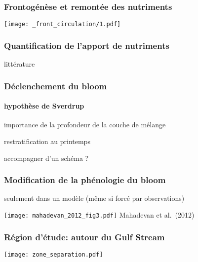 
\begin{frame}
  \frametitle{Frontogénèse et remontée des nutriments}
  \centering
  \texttt{[image: \_front\_circulation/1.pdf]}%
\end{frame}


\begin{frame}
  \frametitle{Quantification de l'apport de nutriments}

  littérature

\end{frame}


\begin{frame}
  \frametitle{Déclenchement du bloom}
  \framesubtitle{hypothèse de Sverdrup}
  importance de la profondeur de la couche de mélange

  restratification au printemps

  accompagner d'un schéma ?
\end{frame}


\begin{frame}
  \frametitle{Modification de la phénologie du bloom}
  seulement dans un modèle (même si forcé par observations)

  \texttt{[image: mahadevan\_2012\_fig3.pdf]}
  Mahadevan et al.\ (2012)
\end{frame}


\begin{frame}
  \frametitle{Région d'étude: autour du Gulf Stream}


  \vfill

  \texttt{[image: zone\_separation.pdf]}
\end{frame}

